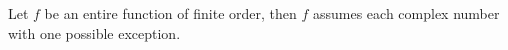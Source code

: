 Let $f$ be an entire function of finite order, then $f$ assumes each complex number with one possible exception.